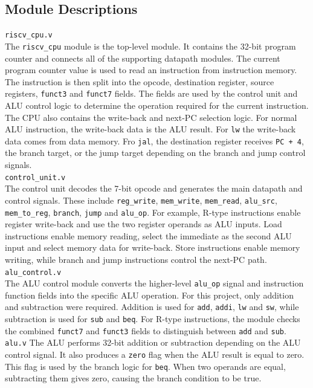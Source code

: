 \documentclass[12pt,a4paper]{article}
\begin{document}
\subsection{Module Descriptions}
\texttt{riscv\_cpu.v}\\
The \texttt{riscv\_cpu} module is the top-level module. It contains the 32-bit program counter and connects all of the supporting datapath modules. The current program counter value is used to read an instruction from instruction memory. The instruction is then split into the opcode, destination register, source registers, \texttt{funct3} and \texttt{funct7} fields. The fields are used by the control unit and ALU control logic to determine the operation required for the current instruction.\\
\bigskip
The CPU also contains the write-back and next-PC selection logic. For normal ALU instruction, the write-back data is the ALU result. For \texttt{lw} the write-back data comes from data memory. Fro \texttt{jal}, the destination register receives \texttt{PC + 4}, the branch target, or the jump target depending on the branch and jump control signals.\\
\bigskip
\texttt{control\_unit.v}\\
The control unit decodes the 7-bit opcode and generates the main datapath and control signals. These include \texttt{reg\_write}, \texttt{mem\_write}, \texttt{mem\_read}, \texttt{alu\_src}, \texttt{mem\_to\_reg}, \texttt{branch}, \texttt{jump} and \texttt{alu\_op}. For example, R-type instructions enable register write-back and use the two register operands as ALU inputs. Load instructions enable memory reading, select the immediate as the second ALU input and select memory data for write-back. Store instructions enable memory writing, while branch and jump instructions control the next-PC path.\\
\bigskip
\texttt{alu\_control.v}\\
The ALU control module converts the higher-level \texttt{alu\_op} signal and instruction function fields into the specific ALU operation. For this project, only addition and subtraction were required. Addition is used for \texttt{add}, \texttt{addi}, \texttt{lw} and \texttt{sw}, while subtraction is used for \texttt{sub} and \texttt{beq}. For R-type instructions, the module checks the combined \texttt{funct7} and \texttt{funct3} fields to distinguish between \texttt{add} and \texttt{sub}.\\
\bigskip
\texttt{alu.v}
The ALU performs 32-bit addition or subtraction depending on the ALU control signal. It also produces a \texttt{zero} flag when the ALU result is equal to zero. This flag is used by the branch logic for \texttt{beq}. When two operands are equal, subtracting them gives zero, causing the branch condition to be true.\\
\end{document}
